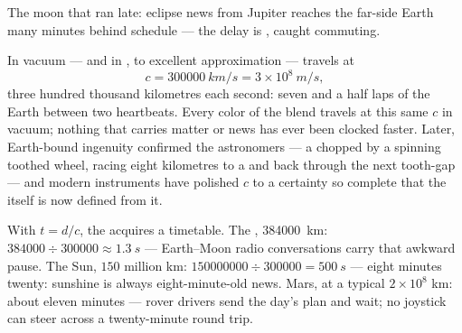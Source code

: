 \begin{omfigure}

{\small The moon that ran late: eclipse news from Jupiter
reaches the far-side Earth many minutes behind schedule ---
the delay is , caught commuting.}
\end{omfigure}

\begin{proposition}\label{prop:g8:speed-of-light:value}
In vacuum --- and in , to excellent approximation --- 
travels at
\[
c = \qty{300000}{km/s} = 3 \times 10^{8}\ \unit{m/s},
\]
three hundred thousand kilometres each second: seven and a
half laps of the Earth between two heartbeats. Every color of
the blend travels at this same $c$ in vacuum; nothing that
carries matter or news has ever been clocked faster. Later,
Earth-bound ingenuity confirmed the astronomers --- a 
chopped by a spinning toothed wheel, racing eight kilometres
to a  and back through the next tooth-gap --- and
modern instruments have polished $c$ to a certainty so
complete that the  itself is now defined from it.
\end{proposition}

\begin{example}\label{ex:g8:speed-of-light:times}
With $t = d/c$, the  acquires a timetable. The
, \qty{384000}{km}: $384000 \div 300000 \approx
\qty{1.3}{s}$ --- Earth--Moon radio conversations carry that
awkward pause. The Sun, $150$ million km: $150000000 \div
300000 = \qty{500}{s}$ --- eight minutes twenty: sunshine is
always eight-minute-old news. Mars, at a typical $2 \times
10^{8}$ km: about eleven minutes --- rover drivers send the
day's plan and wait; no joystick can steer across a
twenty-minute round trip.
\end{example}

